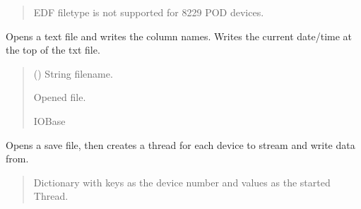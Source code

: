 \documentclass[letterpaper,10pt,english]{sphinxmanual}
\begin{document}
\begin{fulllineitems}
\begin{fulllineitems}
\begin{quote}
\begin{description}
\begin{itemize}
\end{itemize}

\sphinxAtStartPar
{} \textendash{} EDF filetype is not supported for 8229 POD devices.

\end{description}\end{quote}

\end{fulllineitems}


\begin{fulllineitems}
\label{\detokenize{Setup_8229:Setup_8229.Setup_8229._OpenSaveFile_TXT}}
\pysigstartsignatures
{}
\pysigstopsignatures
\sphinxAtStartPar
Opens a text file and writes the column names. Writes the current date/time         at the top of the txt file.
\begin{quote}\begin{description}
\sphinxAtStartPar
{} () \textendash{} String filename.

\sphinxAtStartPar
Opened file.

\sphinxAtStartPar
IOBase

\end{description}\end{quote}

\end{fulllineitems}


\begin{fulllineitems}
\label{\detokenize{Setup_8229:Setup_8229.Setup_8229._StreamThreading}}
\pysigstartsignatures
{}
\pysigstopsignatures
\sphinxAtStartPar
Opens a save file, then creates a thread for each device to stream and write         data from.
\begin{quote}\begin{description}
\sphinxAtStartPar
Dictionary with keys as the device number and values as the                 started Thread.


\end{description}
\end{quote}
\end{fulllineitems}
\end{fulllineitems}
\end{document}
